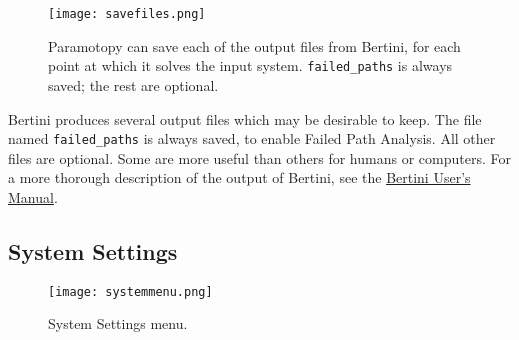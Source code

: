 \begin{figure}[h]
\begin{center}
\texttt{[image: savefiles.png]}
\caption[File Saving]{Paramotopy can save each of the output files from Bertini, for each point at which it solves the input system.  \texttt{failed\_paths} is always saved; the rest are optional.}
\label{screen:savefilesmenu}
\end{center}
\end{figure}

Bertini produces several output files which may be desirable to keep.  The file named \texttt{failed\_paths} is always saved, to enable Failed Path Analysis.  All other files are optional.  Some are more useful than others for humans or computers.  For a more thorough description of the output of Bertini, see the \href{http://www.nd.edu/~sommese/bertini/BertiniUsersManual.pdf}{Bertini User's Manual}.







\subsection{System Settings}
\begin{figure}[h]
\begin{center}
\texttt{[image: systemmenu.png]}
\caption[General Settings Menu]{System Settings menu.}
\label{screen:systemmenu}
\end{center}
\end{figure}

